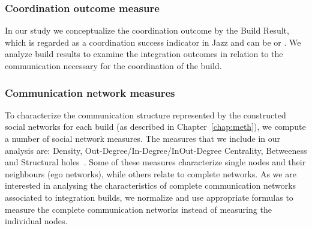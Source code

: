 \subsubsection{Coordination outcome measure}
In our study we conceptualize the coordination outcome by the Build Result,
which is regarded as a coordination success indicator in Jazz and can be \error
or \ok. We analyze build results to examine the integration
outcomes in relation to the communication necessary for the coordination of the
build.
%


\subsubsection{Communication network measures}
To characterize the communication structure represented by the constructed social
networks for each build (as described in Chapter~\ref{chap:meth}), we compute a number of social network measures. The
measures that we include in our analysis are: Density, Out-Degree/In-Degree/InOut-Degree Centrality, Betweeness and Structural holes~\cite{Freeman:1979rl}. Some of these measures characterize single nodes and their neighbours (ego
networks), while others relate to complete networks. As we are interested in
analysing the characteristics of complete communication networks associated to
integration builds, we normalize and use appropriate formulas to measure the
complete communication networks instead of measuring the individual nodes.



